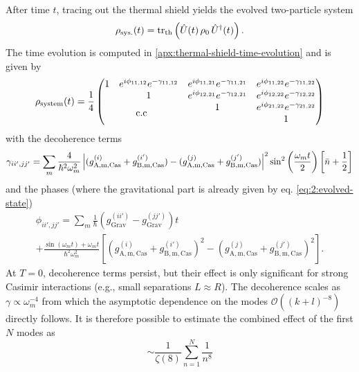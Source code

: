 After time $t$, tracing out the thermal shield yields the evolved two-particle system
\begin{equation}
  \rho_\mathrm{sys.}(t) = \tr_\mathrm{th}\left(\hat{U}(t) \, \rho_0 \, \hat{U}^\dagger(t)\right) .
\end{equation}
The time evolution is computed in \cref{apx:thermal-shield-time-evolution} and is given by
\begin{equation}
  \rho_\mathrm{system}(t) = \frac{1}{4} \begin{pmatrix}
    1 & e^{i\phi_{11,12}} e^{-\gamma_{11,12}} & e^{i\phi_{11,21}} e^{-\gamma_{11,21}} & e^{i\phi_{11,22}} e^{-\gamma_{11,22}} \\
    & 1 & e^{i\phi_{12,21}} e^{-\gamma_{12,21}} & e^{i\phi_{12,22}} e^{-\gamma_{12,22}} \\
    \multicolumn{2}{c}{\multirow{2}{*}{c.c}} & 1 & e^{i\phi_{21,22}} e^{-\gamma_{21,22}} \\
    & & & 1 \\
  \end{pmatrix}
\end{equation}
with the decoherence terms
\begin{equation}\label{eq:5:analytical-decoherence}
  \gamma_{ii',jj'} = \sum_m \frac{4}{\hbar^2\omega_m^2} \left\lvert(g^{(i)}_\mathrm{A,m,Cas} + g^{(i')}_\mathrm{B,m,Cas}) - (g^{(j)}_\mathrm{A,m,Cas} + g^{(j')}_\mathrm{B,m,Cas})\right\rvert^2 \sin^2\left(\frac{\omega_m t}{2}\right) \left[\bar{n} + \frac{1}{2}\right]
\end{equation}
and the phases (where the gravitational part is already given by eq. \eqref{eq:2:evolved-state})
\begin{multline}\label{eq:5:analytical-phases}
  \phi_{ii',jj'} = \sum_m \frac{1}{\hbar} \left( g^{(ii')}_\mathrm{Grav} - g^{(jj')}_\mathrm{Grav} \right) t \\
  + \frac{\sin(\omega_m t)+\omega_m t}{\hbar^2\omega_m^2}\left[(g^{(i)}_\mathrm{A,m,Cas} + g^{(i')}_\mathrm{B,m,Cas})^2 - (g^{(j)}_\mathrm{A,m,Cas} + g^{(j')}_\mathrm{B,m,Cas})^2\right] .
\end{multline}
At $T=0$, decoherence terms persist, but their effect is only significant for strong Casimir interactions (e.g., small separations $L\approx R$).
The decoherence scales as $\gamma \propto \omega_m^{-4}$ from which the asymptotic dependence on the modes $\mathcal{O}((k+l)^{-8})$ directly follows.
It is therefore possible to estimate the combined effect of the first $N$ modes as
\begin{equation}\label{eq:5:effect-of-a-mode}
  \sim \frac{1}{\zeta(8)} \sum_{n=1}^{N} \frac{1}{n^8}
\end{equation}
